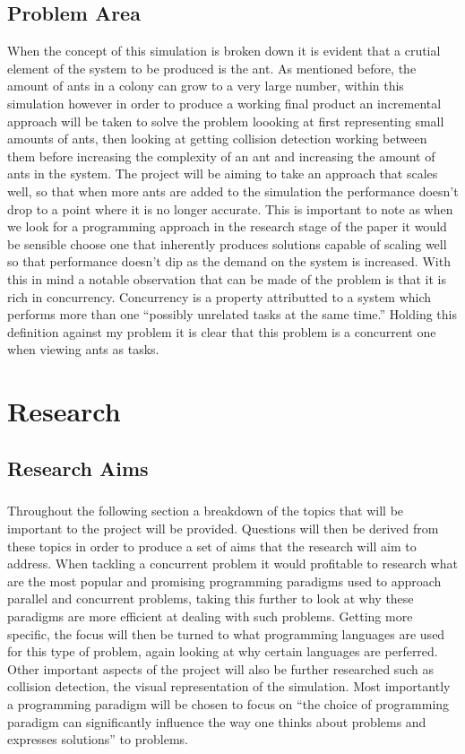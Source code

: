 \documentclass[main.tex]{subfiles}
\begin{document}
\section{Problem Area}
When the concept of this simulation is broken down it is evident that a crutial element of the system to be produced is the ant. As mentioned before, the amount of ants in a colony can grow to a very large number, within this simulation however in order to produce a working final product an incremental approach will be taken to solve the problem loooking at first representing small amounts of ants, then looking at getting collision detection working between them before increasing the complexity of an ant and increasing the amount of ants in the system. The project will be aiming to take an approach that scales well, so that when more ants are added to the simulation the performance doesn't drop to a point where it is no longer accurate. This is important to note as when we look for a programming approach in the research stage of the paper it would be sensible choose one that inherently produces solutions capable of scaling well so that performance doesn't dip as the demand on the system is increased.
With this in mind a notable observation that can be made of the problem is that it is rich in concurrency. Concurrency is a property attributted to a system which performs more than one ``possibly unrelated tasks at the same time.'' \cite{OSullivan2008} Holding this definition against my problem it is clear that this problem is a concurrent one when viewing ants as tasks.

\chapter{Research}
\section {Research Aims}
\paragraph{}Throughout the following section a breakdown of the topics that will be important to the project will be provided. Questions will then be derived from these topics in order to produce a set of aims that the research will aim to address. When tackling a concurrent problem it would profitable to research what are the most popular and promising programming paradigms used to approach parallel and concurrent problems, taking this further to look at why these paradigms are more efficient at dealing with such problems. Getting more specific, the focus will then be turned to what programming languages are used for this type of problem, again looking at why certain languages are perferred. Other important aspects of the project will also be further researched such as collision detection, the visual representation of the simulation. Most importantly a programming paradigm will be chosen to focus on ``the choice of programming paradigm can significantly influence the way one thinks about problems and expresses solutions'' to problems. \cite{Curriculum2008}
\end{document}
